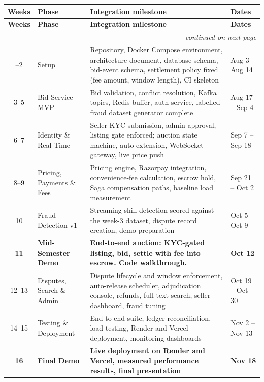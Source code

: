 \documentclass[11pt, a4paper]{article}
\begin{document}
{\small
\begin{longtable}{@{}c l p{2.8in} l@{}}
\toprule
\textbf{Weeks} & \textbf{Phase} & \textbf{Integration milestone} & \textbf{Dates} \\
\midrule
\endfirsthead
\toprule
\textbf{Weeks} & \textbf{Phase} & \textbf{Integration milestone} & \textbf{Dates} \\
\midrule
\endhead
\midrule
\multicolumn{4}{r}{\footnotesize\emph{continued on next page}}\\
\endfoot
\bottomrule
\endlastfoot
1--2   & Setup                & Repository, Docker Compose environment, architecture document, database schema, bid-event schema, settlement policy fixed (fee amount, window length), CI skeleton & Aug 3 -- Aug 14 \\
3--5   & Bid Service MVP      & Bid validation, conflict resolution, Kafka topics, Redis buffer, auth service, labelled fraud dataset generator complete & Aug 17 -- Sep 4 \\
6--7   & Identity \& Real-Time & Seller KYC submission, admin approval, listing gate enforced; auction state machine, auto-extension, WebSocket gateway, live price push & Sep 7 -- Sep 18 \\
8--9   & Pricing, Payments \& Fees & Pricing engine, Razorpay integration, convenience-fee calculation, escrow hold, Saga compensation paths, baseline load measurement & Sep 21 -- Oct 2 \\
10     & Fraud Detection v1   & Streaming shill detection scored against the week-3 dataset, dispute record creation, demo preparation & Oct 5 -- Oct 9 \\
\textbf{11} & \textbf{Mid-Semester Demo} & \textbf{End-to-end auction: KYC-gated listing, bid, settle with fee into escrow. Code walkthrough.} & \textbf{Oct 12} \\
12--13 & Disputes, Search \& Admin & Dispute lifecycle and window enforcement, auto-release scheduler, adjudication console, refunds, full-text search, seller dashboard, fraud tuning & Oct 19 -- Oct 30 \\
14--15 & Testing \& Deployment & End-to-end suite, ledger reconciliation, load testing, Render and Vercel deployment, monitoring dashboards & Nov 2 -- Nov 13 \\
\textbf{16} & \textbf{Final Demo} & \textbf{Live deployment on Render and Vercel, measured performance results, final presentation} & \textbf{Nov 18} \\
\bottomrule
\end{longtable}
}
\end{document}
